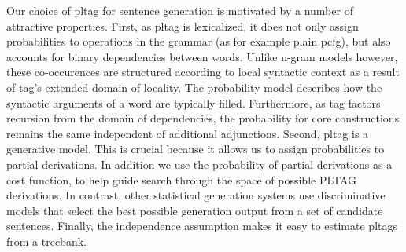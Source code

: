 Our choice of {\sc pltag} for sentence generation is motivated by a number of attractive properties.
 First, as {\sc pltag} is lexicalized, it does not only assign probabilities to operations in the grammar (as for example plain {\sc pcfg}), but also accounts for binary dependencies between words. Unlike n-gram models however, these co-occurences are structured according to local syntactic context as a result of {\sc tag}'s extended domain of locality. The probability model describes how the syntactic arguments of a word are typically filled. 
Furthermore, as {\sc tag} factors recursion from the domain of dependencies, the probability for core constructions remains the same independent of additional adjunctions. 
Second, {\sc pltag} is a generative model. This is crucial because it allows us to assign probabilities to partial derivations. In addition we use the probability of partial derivations as a cost function, to help guide search through the space of possible PLTAG derivations. In contrast, other statistical generation systems use discriminative models that select the best possible generation output from a set of candidate sentences.
Finally, the independence assumption makes it easy to estimate {\sc pltag}s from a treebank.

